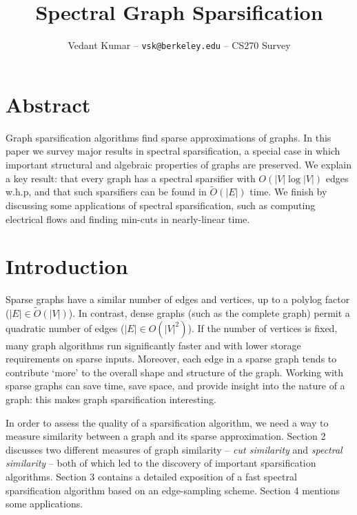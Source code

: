 \documentclass{article}
\title{Spectral Graph Sparsification}
\author{\small{Vedant Kumar -- \texttt{vsk@berkeley.edu} -- CS270 Survey}}
\begin{document}
\maketitle

\newcommand \cut[1]{\text{cut}_{#1}}
\newcommand \textlcsc[1]{\textsc{\MakeLowercase{#1}}}
\newcommand \Tr{\text{Tr}}

\section*{Abstract}

Graph sparsification algorithms find sparse approximations of graphs. In
this paper we survey major results in spectral sparsification, a special
case in which important structural and algebraic properties of graphs are
preserved. We explain a key result: that every graph has a spectral
sparsifier with $O(|V|\log|V|)$ edges w.h.p, and that such sparsifiers can
be found in $\tilde{O}(|E|)$ time. We finish by discussing some applications
of spectral sparsification, such as computing electrical flows and finding
min-cuts in nearly-linear time.

\section{Introduction}

Sparse graphs have a similar number of edges and vertices, up to a polylog
factor ($|E| \in \tilde{O}(|V|)$). In contrast, dense graphs (such as the
complete graph) permit a quadratic number of edges ($|E| \in O(|V|^2)$). If
the number of vertices is fixed, many graph algorithms run significantly
faster and with lower storage requirements on sparse inputs.  Moreover, each
edge in a sparse graph tends to contribute `more' to the overall shape and
structure of the graph.  Working with sparse graphs can save time, save
space, and provide insight into the nature of a graph: this makes graph
sparsification interesting.

In order to assess the quality of a sparsification algorithm, we need a way
to measure similarity between a graph and its sparse approximation. Section
2 discusses two different measures of graph similarity -- \textit{cut
similarity} and \textit{spectral similarity} -- both of which led to the
discovery of important sparsification algorithms. Section 3 contains a
detailed exposition of a fast spectral sparsification algorithm based on an
edge-sampling scheme. Section 4 mentions some applications.
\end{document}
